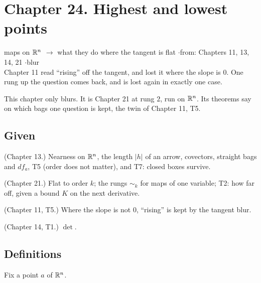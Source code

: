 \newpage

\section*{Chapter 24. Highest and lowest points}
\begin{center}
{\normalsize maps on $\mathbb{R}^n$ $\to$ what they do where the tangent is flat \quad$\cdot$\quad from: Chapters 11, 13, 14, 21 \quad$\cdot$\quad blur}\\[4pt]
{\small Chapter 11 read ``rising'' off the tangent, and lost it where the slope is $0$. One rung up the question comes back, and is lost again in exactly one case.}
\end{center}

This chapter only blurs. It is Chapter 21 at rung $2$, run on $\mathbb{R}^n$. Its theorems say on which bags one question is kept, the twin of Chapter 11, T5.

\subsection*{Given}

\begin{lines}
\item[\lab{G1}] (Chapter 13.) Nearness on $\mathbb{R}^n$, the length $|h|$ of an arrow, covectors, straight bags and $df_a$, T5 (order does not matter), and T7: closed boxes survive.
\item[\lab{G2}] (Chapter 21.) Flat to order $k$; the rungs $\sim_k$ for maps of one variable; T2: how far off, given a bound $K$ on the next derivative.
\item[\lab{G3}] (Chapter 11, T5.) Where the slope is not $0$, ``rising'' is kept by the tangent blur.
\item[\lab{G4}] (Chapter 14, T1.) $\det$.
\end{lines}

\subsection*{Definitions}

Fix a point $a$ of $\mathbb{R}^n$.

